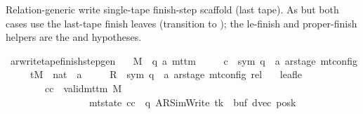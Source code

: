 \begin{isabellebody}
\begin{isamarkuptext}
\end{isamarkuptext}\isamarkuptrue%
%
\begin{isamarkuptext}%
Relation-generic write single-tape finish-step scaffold
  (last tape).  As  but both cases use
  the last-tape finish leaves (transition to );
  the le-finish and proper-finish helpers are the  and
   hypotheses.%
\end{isamarkuptext}\isamarkuptrue%
\isamarkupfalse%
\ ar{\isacharunderscore}{\kern0pt}write{\isacharunderscore}{\kern0pt}tape{\isacharunderscore}{\kern0pt}finish{\isacharunderscore}{\kern0pt}step{\isacharunderscore}{\kern0pt}gen{\isacharcolon}{\kern0pt}\isanewline
\ \ \ M\ {\isacharcolon}{\kern0pt}{\isacharcolon}{\kern0pt}\ {\isachardoublequoteopen}{\isacharparenleft}{\kern0pt}{\isacharprime}{\kern0pt}q{\isacharcomma}{\kern0pt}\ {\isacharprime}{\kern0pt}a{\isacharparenright}{\kern0pt}\ mttm{\isachardoublequoteclose}\isanewline
\ \ \ \ \ c{\isacharprime}{\kern0pt}\ {\isacharcolon}{\kern0pt}{\isacharcolon}{\kern0pt}\ {\isachardoublequoteopen}{\isacharparenleft}{\kern0pt}sym{}{\isacharcomma}{\kern0pt}\ {\isacharprime}{\kern0pt}q\ {\isasymtimes}\ {\isacharprime}{\kern0pt}a\ ar{\isacharunderscore}{\kern0pt}stage{\isacharparenright}{\kern0pt}\ mt{\isacharunderscore}{\kern0pt}config{\isachardoublequoteclose}\isanewline
\ \ \ \ \ tM\ {\isacharcolon}{\kern0pt}{\isacharcolon}{\kern0pt}\ {\isachardoublequoteopen}nat\ {\isasymRightarrow}\ {\isacharprime}{\kern0pt}a{\isachardoublequoteclose}\isanewline
\ \ \ \ \ R{\isacharprime}{\kern0pt}\ {\isacharcolon}{\kern0pt}{\isacharcolon}{\kern0pt}\ {\isachardoublequoteopen}{\isacharparenleft}{\kern0pt}sym{}{\isacharcomma}{\kern0pt}\ {\isacharprime}{\kern0pt}q\ {\isasymtimes}\ {\isacharprime}{\kern0pt}a\ ar{\isacharunderscore}{\kern0pt}stage{\isacharparenright}{\kern0pt}\ mt{\isacharunderscore}{\kern0pt}config\ rel{\isachardoublequoteclose}\isanewline
\ \ \ leaf{\isacharunderscore}{\kern0pt}le{\isacharcolon}{\kern0pt}\isanewline
\ \ \ \ \ \ \ \ {\isachardoublequoteopen}{\isasymAnd}cc{\isachardot}{\kern0pt}\ {\isasymlbrakk}\ valid{\isacharunderscore}{\kern0pt}mttm\ M{\isacharsemicolon}{\kern0pt}\isanewline
\ \ \ \ \ \ \ \ \ \ \ \ \ \ \ \ \ mt{\isacharunderscore}{\kern0pt}state\ cc\ {\isacharequal}{\kern0pt}\ {\isacharparenleft}{\kern0pt}q{\isacharcomma}{\kern0pt}\ AR{\isacharunderscore}{\kern0pt}SimWrite{\isacharcomma}{\kern0pt}\ tk{\isacharcomma}{\kern0pt}\ {}{\isacharcomma}{\kern0pt}\ buf{\isacharcomma}{\kern0pt}\ dvec{\isacharcomma}{\kern0pt}\ posk{\isacharparenright}{\kern0pt}{\isacharsemicolon}{\kern0pt}\isanewline

\end{isabellebody}

